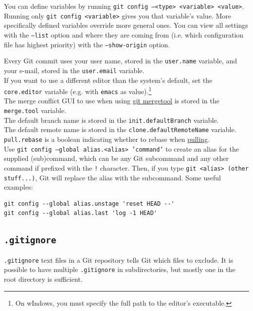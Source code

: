 \documentclass[table, xcdraw]{article}%
\begin{document}
You can define variables by running \texttt{git config --<type> <variable> <value>}. Running only \texttt{git config <variable>} gives you that variable's value. More specifically defined variables override more general ones. You can view all settings with the \texttt{--list} option and where they are coming from (i.e. which configuration file has highest priority) with the \texttt{--show-origin} option.

Every Git commit uses your user name, stored in the \texttt{user.name} variable, and your e-mail, stored in the \texttt{user.email} variable.\\
If you want to use a different editor than the system's default, set the \texttt{core.editor} variable (e.g. with \texttt{emacs} as value).\footnote{On wIndows, you must specify the full path to the editor's executable.}\\
The merge conflict GUI to use when using \hyperref[mergetool]{git mergetool} is stored in the \texttt{merge.tool} variable.\\
The default branch name is stored in the \texttt{init.defaultBranch} variable.\\
The default remote name is stored in the \texttt{clone.defaultRemoteName} variable.\\
\texttt{pull.rebase} is a boolean indicating whether to rebase when \hyperref[pull]{pulling}.\\
Use \texttt{git config --global alias.<alias> 'command'} to create an alias for the supplied (sub)command, which can be any Git subcommand and any other command if prefixed with the \texttt{!} character. Then, if you type \texttt{git <alias> (other stuff...)}, Git will replace the alias with the subcommand. Some useful examples:

\begin{verbatim}
git config --global alias.unstage 'reset HEAD --'
git config --global alias.last 'log -1 HEAD'
\end{verbatim}

\subsection{\texttt{.gitignore}} \label{gitignore}

\texttt{.gitignore} text files in a Git repository tells Git which files to exclude. It is possible to have multiple \texttt{.gitignore} in subdirectories, but mostly one in the root directory is sufficient.
\end{document}
